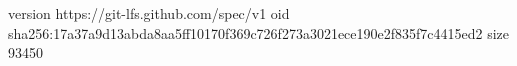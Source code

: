 version https://git-lfs.github.com/spec/v1
oid sha256:17a37a9d13abda8aa5ff10170f369c726f273a3021ece190e2f835f7c4415ed2
size 93450
